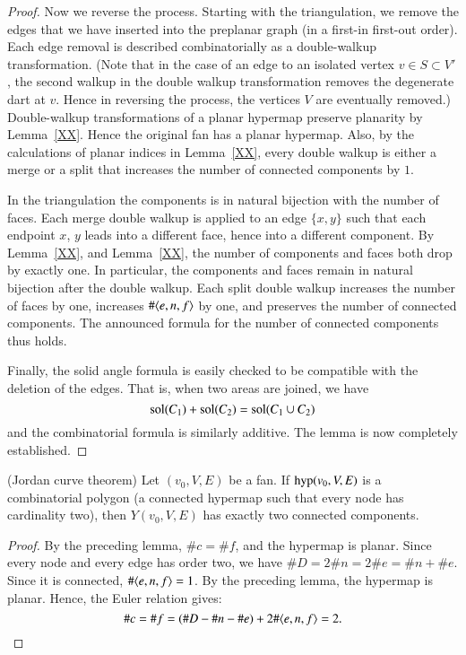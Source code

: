 \begin{proof}
Now we reverse the process.  Starting with the triangulation, we remove the
edges that we have inserted into the preplanar graph  (in a first-in first-out order).  
Each edge removal is
described combinatorially as a double-walkup transformation.  (Note that
in the case of an edge to an isolated vertex  $v\in S\subset V'$, the second walkup
in the double walkup
transformation removes the degenerate dart at $v$.  Hence in reversing the process,
the vertices $V$ are eventually removed.)  Double-walkup transformations of
a planar hypermap preserve planarity by Lemma~\ref{XX}.  Hence the original
fan has a planar hypermap.  Also, by the calculations of planar indices
in Lemma~\ref{XX}, every double walkup is either a merge or a split that
increases the number of connected components by $1$.

In the triangulation the components is in natural bijection with the number of faces.
Each merge double walkup is applied to an edge $\{x,y\}$ such that each endpoint $x$,
$y$ leads into a different face, hence into a different component.  By Lemma~\ref{XX},
and Lemma~\ref{XX}, the number of components and faces both drop by exactly one.
In particular, the components and faces remain in natural bijection after the
double walkup.  Each split double walkup increases the number of faces by one,
increases $\#\langle e,n,f\rangle$ by one, and preserves the number of connected components.
The announced formula for the number of connected components thus holds.

Finally, the solid angle formula is easily checked to be compatible with
the deletion of the edges.  That is, when two areas are joined, we have
  $${\operatorname{sol}}(C_1) + {\operatorname{sol}}(C_2) = {\operatorname{sol}}(C_1\cup C_2)$$
and the combinatorial formula is similarly additive.
The lemma is now completely established.
\end{proof}



\begin{lemma} (Jordan curve theorem)  Let $(v_0,V,E)$ be a fan.
If ${\operatorname{hyp}}(v_0,V,E)$ is a combinatorial polygon (a
connected hypermap such that every node has cardinality two), then
$Y(v_0,V,E)$ has exactly two connected components.
\end{lemma}

\begin{proof} By the preceding lemma, $\# c = \#f$, and the
hypermap is planar.  Since every node and every edge has order two,
we have $\#D = 2\#n = 2\# e = \#n +\#e$.  Since it is connected,
$\#\langle e,n,f\rangle = 1$.  By the preceding lemma, the hypermap is
planar. Hence, the Euler relation gives:
    $$
    \#c = \#f = (\#D - \#n - \#e) + 2\#\langle e,n,f\rangle =2.
    $$
\end{proof}


